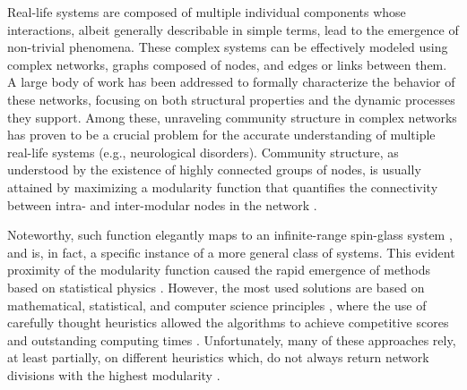 \documentclass[pdflatex,sn-mathphys-num]{sn-jnl}%
\begin{document}
Real-life systems are composed of multiple individual components whose interactions, albeit generally describable in simple terms, lead to the emergence of non-trivial phenomena. These complex systems can be effectively modeled using complex networks, graphs composed of nodes, and edges or links between them. A large body of work has been addressed to formally characterize the behavior of these networks, focusing on both structural properties and the dynamic processes they support. Among these, unraveling community structure in complex networks has proven to be a crucial problem for the accurate understanding of multiple real-life systems (e.g., neurological disorders). Community structure, as understood by the existence of highly connected groups of nodes, is usually attained by maximizing a modularity function \cite{Newman-Girvan_2004} that quantifies the connectivity between intra- and inter-modular nodes in the network \cite{Girvan2002}. 

Noteworthy, such function elegantly maps to an infinite-range spin-glass system \cite{Newman2006,Reichardt2006}, and is, in fact, a specific instance of a more general class of systems. This evident proximity of the modularity function caused the rapid emergence of methods based on statistical physics \citep{Guimera2004,Massen2005,Reichardt2006}. However, the most used solutions are based on mathematical, statistical, and computer science principles \citep{Girvan2002,Newman-Girvan_2004,Newman2004,Duch2005,Ziv2005,Newman2006,Blondel2008,Newman2016,Traag2019}, where the use of carefully thought heuristics allowed the algorithms to achieve competitive scores and outstanding computing times \citep{Danon2005}. Unfortunately, many of these approaches rely, at least partially, on different heuristics which, do not always return network divisions with the highest modularity \citep{aref2022,aref2023,Good2010}. 
\end{document}
